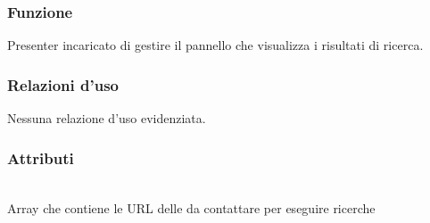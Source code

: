 
\subsubsection*{Funzione}
Presenter incaricato di gestire il pannello che visualizza i risultati di ricerca.

\subsubsection*{Relazioni d'uso}
Nessuna relazione d'uso evidenziata.

\subsubsection*{Attributi}
\begin{description}
\item{}\\
Array che contiene le URL delle  da contattare per eseguire ricerche
\end{description}

